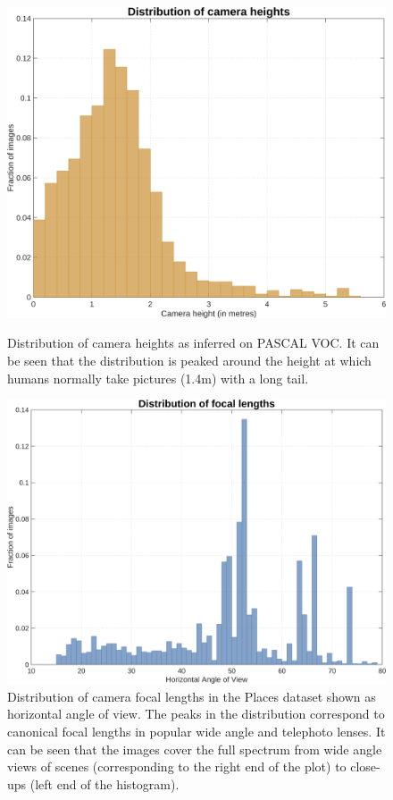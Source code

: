 \begin{figure}[htb!]
  \centering
  \begin{minipage}{.45\textwidth}
    \centering
    \includegraphics[width=0.95\linewidth]{figures/amodal/heights_pred_choc.png}
    \caption{ Distribution of camera heights as inferred on PASCAL VOC. It can be seen that the distribution is peaked around the height at which humans normally take pictures (1.4m) with a long tail.}
  \end{minipage}
  \hfill
  \begin{minipage}{.45\textwidth}
    \centering
    \includegraphics[width=0.95\linewidth]{figures/amodal/fov.png}
    \caption{ Distribution of camera focal lengths in the Places dataset shown as horizontal angle of view. The peaks in the distribution correspond to canonical focal lengths in popular wide angle and telephoto lenses. It can be seen that the images cover the full spectrum from wide angle views of scenes (corresponding to the right end of the plot) to close-ups (left end of the histogram).}
  \end{minipage}
  \end{figure}

